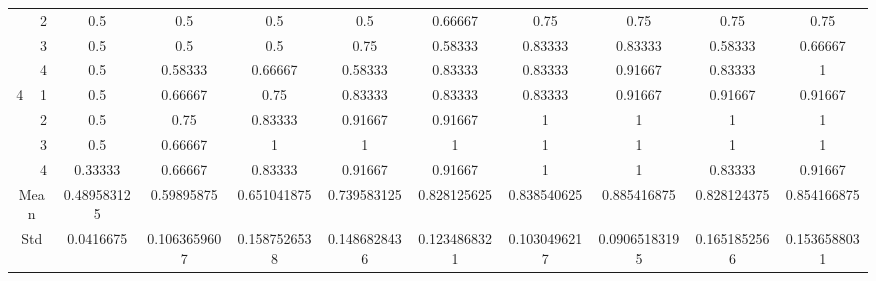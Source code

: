 \documentclass[draft,dvipsnames]{drexel-thesis}
\begin{document}
\begin{thesis}
\begin{table}[!t]
{\begin{tabular}{|c|c|c|c|c|c|c|c|c|c|c|}
                      & 2                   & 0.5         & 0.5          & 0.5          & 0.5          & 0.66667      & 0.75         & 0.75          & 0.75         & 0.75         \\ \cline{2-11} 
                      & 3                   & 0.5         & 0.5          & 0.5          & 0.75         & 0.58333      & 0.83333      & 0.83333       & 0.58333      & 0.66667      \\ \cline{2-11} 
                      & 4                   & 0.5         & 0.58333      & 0.66667      & 0.58333      & 0.83333      & 0.83333      & 0.91667       & 0.83333      & 1            \\ \hline
\multirow{4}{*}{4}    & 1                   & 0.5         & 0.66667      & 0.75         & 0.83333      & 0.83333      & 0.83333      & 0.91667       & 0.91667      & 0.91667      \\ \cline{2-11} 
                      & 2                   & 0.5         & 0.75         & 0.83333      & 0.91667      & 0.91667      & 1            & 1             & 1            & 1            \\ \cline{2-11} 
                      & 3                   & 0.5         & 0.66667      & 1            & 1            & 1            & 1            & 1             & 1            & 1            \\ \cline{2-11} 
                      & 4                   & 0.33333     & 0.66667      & 0.83333      & 0.91667      & 0.91667      & 1            & 1             & 0.83333      & 0.91667      \\ \hline
\multicolumn{2}{|c|}{Mean}                  & 0.489583125 & 0.59895875   & 0.651041875  & 0.739583125  & 0.828125625  & 0.838540625  & 0.885416875   & 0.828124375  & 0.854166875  \\ \hline
\multicolumn{2}{|c|}{Std}                   & 0.0416675   & 0.1063659607 & 0.1587526538 & 0.1486828436 & 0.1234868321 & 0.1030496217 & 0.09065183195 & 0.1651852566 & 0.1536588031 \\ \hline
\end{tabular}}
\end{table}


\end{thesis}
\end{document}
